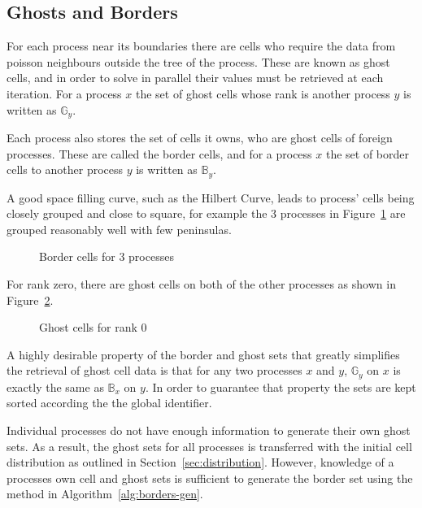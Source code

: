\documentclass[twoside]{IIBproject}
\numberwithin{figure}{section}
\begin{document}


    \subsection{Ghosts and Borders} %
        \label{sec:ghostsandborders}

        For each process near its boundaries there are cells who require the data from poisson neighbours outside the tree of the process. These are known as ghost cells, and in order to solve in parallel their values must be retrieved at each iteration. For a process $x$ the set of ghost cells whose rank is another process $y$ is written as $\mathbb{G}_y$.

        Each process also stores the set of cells it owns, who are ghost cells of foreign processes. These are called the border cells, and for a process $x$ the set of border cells to another process $y$ is written as $\mathbb{B}_y$.

        A good space filling curve, such as the Hilbert Curve, leads to process' cells being closely grouped and close to square, for example the 3 processes in Figure~\ref{fig:borderline} are grouped reasonably well with few peninsulas.

        \begin{figure}[H]
            
            \caption{Border cells for 3 processes}
            \label{fig:borderline}
        \end{figure}

        For rank zero, there are ghost cells on both of the other processes as shown in Figure~\ref{fig:borders-r0}.

        \begin{figure}[H]
            
            \caption{Ghost cells for rank 0}
            \label{fig:borders-r0}
        \end{figure}

        A highly desirable property of the border and ghost sets that greatly simplifies the retrieval of ghost cell data is that for any two processes $x$ and $y$, $\mathbb{G}_y$ on $x$ is exactly the same as $\mathbb{B}_x$ on $y$. In order to guarantee that property the sets are kept sorted according the the global identifier.

        Individual processes do not have enough information to generate their own ghost sets. As a result, the ghost sets for all processes is transferred with the initial cell distribution as outlined in Section~\ref{sec:distribution}. However, knowledge of a processes own cell and ghost sets is sufficient to generate the border set using the method in Algorithm~\ref{alg:borders-gen}.
\end{document}
